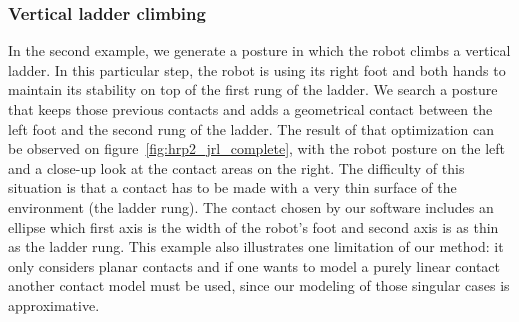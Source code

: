 \subsubsection{Vertical ladder climbing}
\label{subsubsec:ladder}


In the second example, we generate a posture in which the robot climbs a vertical ladder.
In this particular step, the robot is using its right foot and both hands to maintain its stability on top of the first rung of the ladder.
We search a posture that keeps those previous contacts and adds a geometrical contact between the left foot and the second rung of the ladder.
The result of that optimization can be observed on figure~\ref{fig:hrp2_jrl_complete}, with the robot posture on the left and a close-up look at the contact areas on the right.
The difficulty of this situation is that a contact has to be made with a very thin surface of the environment (the ladder rung).
The contact chosen by our software includes an ellipse which first axis is the width of the robot's foot and second axis is as thin as the ladder rung.
This example also illustrates one limitation of our method: it only considers planar contacts and if one wants to model a purely linear contact another contact model must be used, since our modeling of those singular cases is approximative.



